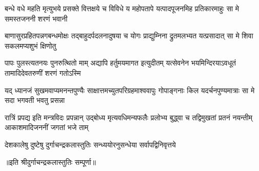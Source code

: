 \fourlineindentedshloka
{बन्धे वधे महति मृत्युभये प्रसक्ते}
{वित्तक्षये च विविधे य महोपतापे}
{यत्पादपूजनमिह प्रतिकारमाहुः}
{सा मे समस्तजननी शरणं भवानी} %

\fourlineindentedshloka
{बाणासुरप्रहितपन्नगबन्धमोक्षः}
{तद्बाहुदर्पदलनादुषया च योगः}
{प्राद्युम्निना द्रुतमलभ्यत यत्प्रसादात्}
{सा मे शिवा सकलमप्यशुभं क्षिणोतु} %

\fourlineindentedshloka
{पापः पुलस्त्यतनयः पुनरुत्थितो माम्}
{अद्यापि हर्तुमयमागत इत्युदीतम्}
{यत्सेवनेन भयमिन्दिरयाऽवधूतं}
{तामादिदेवतरुणीं शरणं गतोऽस्मि} %

\fourlineindentedshloka
{यद् ध्यानजं सुखमवाप्यमनन्तपुण्यैः}
{साक्षात्तमच्युतपरिग्रहमाश्ववापुः}
{गोपाङ्गनाः किल यदर्चनपुण्यमात्राः}
{सा मे सदा भगवती भवतु प्रसन्ना} %

\fourlineindentedshloka
{रात्रिं प्रपद्य इति मन्त्रविदः प्रपन्नान्}
{उद्बोध्य मृत्यवधिमन्यफलैः प्रलोभ्य}
{बुद्ध्वा च तद्विमुखतां प्रतनं नयन्तीम्}
{आकाशमादिजननीं जगतां भजे ताम्} %

\twolineshloka
{देशकालेषु दुष्टेषु दुर्गाचन्द्रकलास्तुतिः}
{सन्ध्ययोरनुसन्धेया सर्वापद्विनिवृत्तये} %

॥इति श्रीदुर्गाचन्द्रकलास्तुतिः सम्पूर्णा॥
